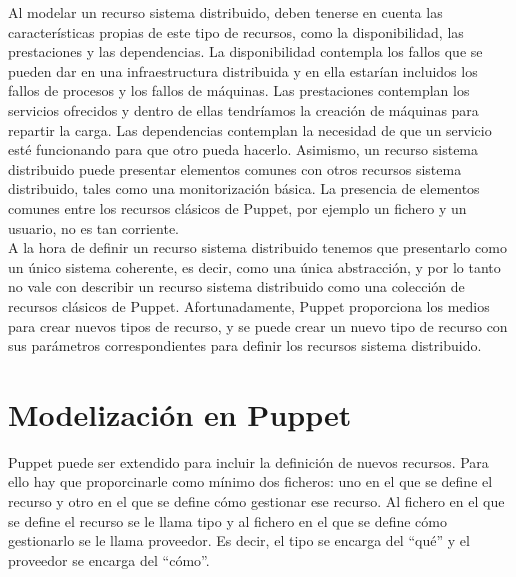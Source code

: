 
Al modelar un recurso sistema distribuido, deben tenerse en cuenta las características propias de este tipo de recursos, como la disponibilidad, las prestaciones y las dependencias. La disponibilidad contempla los fallos que se pueden dar en una infraestructura distribuida y en ella estarían incluidos los fallos de procesos y los fallos de máquinas. Las prestaciones contemplan los servicios ofrecidos y dentro de ellas tendríamos la creación de máquinas para repartir la carga. Las dependencias contemplan la necesidad de que un servicio esté funcionando para que otro pueda hacerlo. Asimismo, un recurso sistema distribuido puede presentar elementos comunes con otros recursos sistema distribuido, tales como una monitorización básica. La presencia de elementos comunes entre los recursos clásicos de Puppet, por ejemplo un fichero y un usuario, no es tan corriente. \\

A la hora de definir un recurso sistema distribuido tenemos que presentarlo como un único sistema coherente, es decir, como una única abstracción, y por lo tanto no vale con describir un recurso sistema distribuido como una colección de recursos clásicos de Puppet. Afortunadamente, Puppet proporciona los medios para crear nuevos tipos de recurso, y se puede crear un nuevo tipo de recurso con sus parámetros correspondientes para definir los recursos sistema distribuido. \\


\section{Modelización en Puppet}

Puppet puede ser extendido para incluir la definición de nuevos recursos. Para ello hay que proporcinarle como mínimo dos ficheros: uno en el que se define el recurso y otro en el que se define cómo gestionar ese recurso. Al fichero en el que se define el recurso se le llama tipo y al fichero en el que se define cómo gestionarlo se le llama proveedor. Es decir, el tipo se encarga del ``qué'' y el proveedor se encarga del ``cómo''.\\


